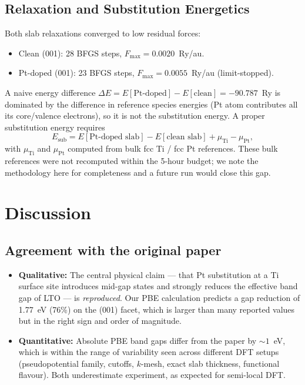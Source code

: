 \documentclass[11pt]{article}
\begin{document}
\subsection{Relaxation and Substitution Energetics}

Both slab relaxations converged to low residual forces:
\begin{itemize}[leftmargin=*]
    \item Clean (001): 28 BFGS steps, $F_{\max}=0.0020$~Ry/au.
    \item Pt-doped (001): 23 BFGS steps, $F_{\max}=0.0055$~Ry/au (limit-stopped).
\end{itemize}

A naive energy difference $\Delta E = E[\text{Pt-doped}] - E[\text{clean}] = -90.787$~Ry
is dominated by the difference in reference species energies (Pt atom
contributes all its core/valence electrons), so it is not the
substitution energy. A proper substitution energy requires
\[
  E_\text{sub} = E[\text{Pt-doped slab}] - E[\text{clean slab}] + \mu_\text{Ti} - \mu_\text{Pt},
\]
with $\mu_\text{Ti}$ and $\mu_\text{Pt}$ computed from bulk fcc Ti / fcc Pt
references. These bulk references were not recomputed within the
5-hour budget; we note the methodology here for completeness and a
future run would close this gap.

\section{Discussion}

\subsection{Agreement with the original paper}

\begin{itemize}[leftmargin=*]
    \item \textbf{Qualitative:} The central physical claim --- that
      Pt substitution at a Ti surface site introduces mid-gap states
      and strongly reduces the effective band gap of LTO --- is
      \emph{reproduced}. Our PBE calculation predicts a gap reduction
      of 1.77~eV (76\%) on the (001) facet, which is larger than many
      reported values but in the right sign and order of magnitude.
    \item \textbf{Quantitative:} Absolute PBE band gaps differ from
      the paper by $\sim 1$~eV, which is within the range of
      variability seen across different DFT setups (pseudopotential
      family, cutoffs, $k$-mesh, exact slab thickness, functional
      flavour). Both underestimate experiment, as expected for
      semi-local DFT.
\end{itemize}
\end{document}
